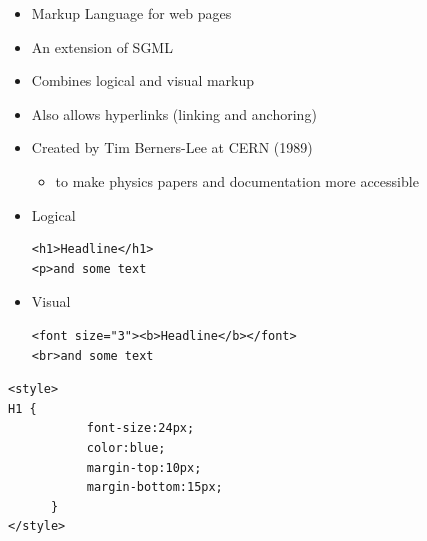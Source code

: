\documentclass[a4paper,landscape,headrule,footrule,xetex]{foils}
\begin{document}

\begin{itemize}
\item Markup Language for web pages
\item An extension of SGML
\item Combines logical and visual markup
\item Also allows hyperlinks (linking and anchoring)
\item Created by Tim Berners-Lee at CERN (1989)
  \begin{itemize}
  \item to make physics papers and documentation more accessible
  \end{itemize}
\end{itemize}






\begin{itemize}
\item Logical
\begin{verbatim}
<h1>Headline</h1>
<p>and some text
\end{verbatim}

\item Visual
\begin{verbatim}
<font size="3"><b>Headline</b></font>
<br>and some text
\end{verbatim}
\end{itemize}

\vspace*{1ex}


\begin{verbatim}
<style>
H1 {
           font-size:24px;
           color:blue;
           margin-top:10px;
           margin-bottom:15px;
      }
</style>
\end{verbatim}
\end{document}

